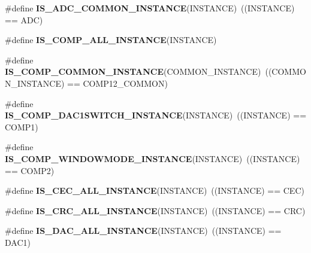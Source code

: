 \begin{DoxyCompactItemize}
\item 
\mbox{\label{group___exported__macro_gad8a5831c786b6b265531b890a194cbe2}} 
\#define {\bfseries I\+S\+\_\+\+A\+D\+C\+\_\+\+C\+O\+M\+M\+O\+N\+\_\+\+I\+N\+S\+T\+A\+N\+CE}(I\+N\+S\+T\+A\+N\+CE)~((I\+N\+S\+T\+A\+N\+CE) == A\+DC)
\item 
\#define {\bfseries I\+S\+\_\+\+C\+O\+M\+P\+\_\+\+A\+L\+L\+\_\+\+I\+N\+S\+T\+A\+N\+CE}(I\+N\+S\+T\+A\+N\+CE)
\item 
\mbox{\label{group___exported__macro_gaa7c8a0729f6b2a35ce000556078fa737}} 
\#define {\bfseries I\+S\+\_\+\+C\+O\+M\+P\+\_\+\+C\+O\+M\+M\+O\+N\+\_\+\+I\+N\+S\+T\+A\+N\+CE}(C\+O\+M\+M\+O\+N\+\_\+\+I\+N\+S\+T\+A\+N\+CE)~((C\+O\+M\+M\+O\+N\+\_\+\+I\+N\+S\+T\+A\+N\+CE) == C\+O\+M\+P12\+\_\+\+C\+O\+M\+M\+ON)
\item 
\mbox{\label{group___exported__macro_gaf2340c4592a47c171624fc99e43e4da5}} 
\#define {\bfseries I\+S\+\_\+\+C\+O\+M\+P\+\_\+\+D\+A\+C1\+S\+W\+I\+T\+C\+H\+\_\+\+I\+N\+S\+T\+A\+N\+CE}(I\+N\+S\+T\+A\+N\+CE)~((I\+N\+S\+T\+A\+N\+CE) == C\+O\+M\+P1)
\item 
\mbox{\label{group___exported__macro_gab7f78e841f84bf7ec834748ca685fbc0}} 
\#define {\bfseries I\+S\+\_\+\+C\+O\+M\+P\+\_\+\+W\+I\+N\+D\+O\+W\+M\+O\+D\+E\+\_\+\+I\+N\+S\+T\+A\+N\+CE}(I\+N\+S\+T\+A\+N\+CE)~((I\+N\+S\+T\+A\+N\+CE) == C\+O\+M\+P2)
\item 
\mbox{\label{group___exported__macro_ga10cad35fdea5ffcb9f17973ce98c7dee}} 
\#define {\bfseries I\+S\+\_\+\+C\+E\+C\+\_\+\+A\+L\+L\+\_\+\+I\+N\+S\+T\+A\+N\+CE}(I\+N\+S\+T\+A\+N\+CE)~((I\+N\+S\+T\+A\+N\+CE) == C\+EC)
\item 
\mbox{\label{group___exported__macro_gaa514941a7f02f65eb27450c05e4e8dd1}} 
\#define {\bfseries I\+S\+\_\+\+C\+R\+C\+\_\+\+A\+L\+L\+\_\+\+I\+N\+S\+T\+A\+N\+CE}(I\+N\+S\+T\+A\+N\+CE)~((I\+N\+S\+T\+A\+N\+CE) == C\+RC)
\item 
\mbox{\label{group___exported__macro_ga94426b97cc5f1644d67f291cbcdba6d8}} 
\#define {\bfseries I\+S\+\_\+\+D\+A\+C\+\_\+\+A\+L\+L\+\_\+\+I\+N\+S\+T\+A\+N\+CE}(I\+N\+S\+T\+A\+N\+CE)~((I\+N\+S\+T\+A\+N\+CE) == D\+A\+C1)

\end{DoxyCompactItemize}

